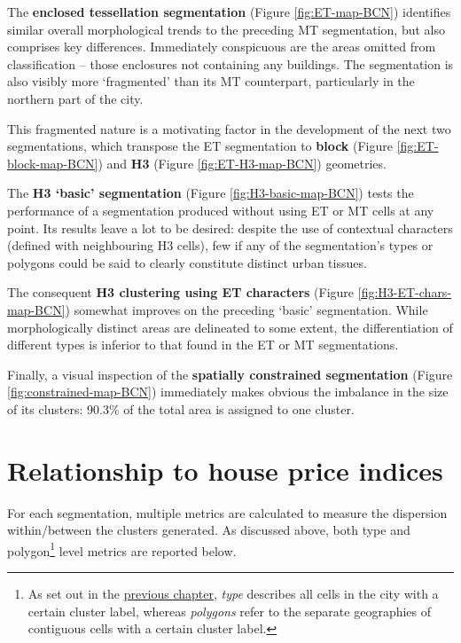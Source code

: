 \documentclass[a4paper, nobind]{templates/ociamthesis}
\begin{document}
The \textbf{enclosed tessellation segmentation} (Figure \ref{fig:ET-map-BCN}) identifies similar overall morphological trends to the preceding MT segmentation, but also comprises key differences. Immediately conspicuous are the areas omitted from classification -- those enclosures not containing any buildings. The segmentation is also visibly more `fragmented' than its MT counterpart, particularly in the northern part of the city.

This fragmented nature is a motivating factor in the development of the next two segmentations, which transpose the ET segmentation to \textbf{block} (Figure \ref{fig:ET-block-map-BCN}) and \textbf{H3} (Figure \ref{fig:ET-H3-map-BCN}) geometries.

The \textbf{H3 `basic' segmentation} (Figure \ref{fig:H3-basic-map-BCN}) tests the performance of a segmentation produced without using ET or MT cells at any point. Its results leave a lot to be desired: despite the use of contextual characters (defined with neighbouring H3 cells), few if any of the segmentation's types or polygons could be said to clearly constitute distinct urban tissues.

The consequent \textbf{H3 clustering using ET characters} (Figure \ref{fig:H3-ET-chars-map-BCN}) somewhat improves on the preceding `basic' segmentation. While morphologically distinct areas are delineated to some extent, the differentiation of different types is inferior to that found in the ET or MT segmentations.

Finally, a visual inspection of the \textbf{spatially constrained segmentation} (Figure \ref{fig:constrained-map-BCN}) immediately makes obvious the imbalance in the size of its clusters: 90.3\% of the total area is assigned to one cluster.

\hypertarget{relationship-to-house-price-indices}{%
\section{Relationship to house price indices}\label{relationship-to-house-price-indices}}

For each segmentation, multiple metrics are calculated to measure the dispersion within/between the clusters generated. As discussed above, both type and polygon\footnote{As set out in the \protect\hyperlink{relation-to-property-prices}{previous chapter}, \emph{type} describes all cells in the city with a certain cluster label, whereas \emph{polygons} refer to the separate geographies of contiguous cells with a certain cluster label.} level metrics are reported below.
\end{document}
